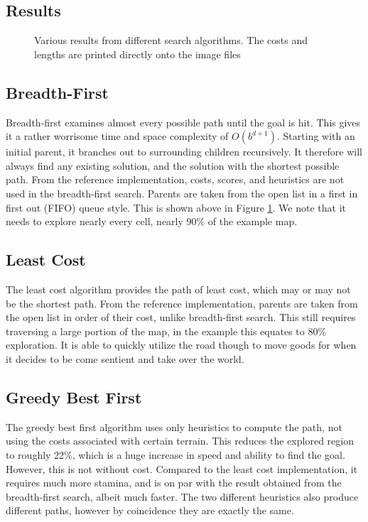\documentclass[11pt,letterpaper]{article}
\begin{document}
\subsection{Results}

\begin{figure}[H]
    \centering

    \qquad
    \qquad
    \qquad
    \qquad
    \qquad
    \caption{Various results from different search algorithms. The costs and lengths are printed directly onto the image files}
    \label{fig:breadth-first}
\end{figure}

\subsection{Breadth-First}
Breadth-first examines almost every possible path until the goal is hit.
This gives it a rather worrisome time and space complexity of $O(b^{d+1})$.
Starting with an initial parent, it branches out to surrounding children recursively.
It therefore will always find any existing solution, and the solution with the shortest possible path.
From the reference implementation, costs, scores, and heuristics are not used in the breadth-first search. Parents are taken from the open list in a first in first out (FIFO) queue style.
This is shown above in Figure \ref{fig:breadth-first}.
We note that it needs to explore nearly every cell, nearly 90\% of the example map.

\subsection{Least Cost}
The least cost algorithm provides the path of least cost, which may or may not be the shortest path.
From the reference implementation, parents are taken from the open list in order of their cost, unlike breadth-first search. This still requires traversing a large portion of the map, in the example this equates to 80\% exploration.
It is able to quickly utilize the road though to move goods for when it decides to be come sentient and take over the world.

\subsection{Greedy Best First}
The greedy best first algorithm uses only heuristics to compute the path, not using the costs associated with certain terrain.
This reduces the explored region to roughly 22\%, which is a huge increase in speed and ability to find the goal.
However, this is not without cost.
Compared to the least cost implementation, it requires much more stamina, and is on par with the result obtained from the breadth-first search, albeit much faster.
The two different heuristics also produce different paths, however by coincidence they are exactly the same.
\end{document}
